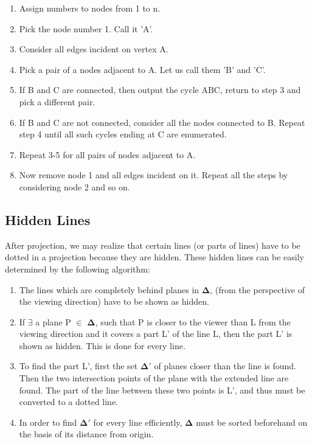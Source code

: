 \documentclass{article}
\begin{document}
\begin{enumerate}
    \item[] Assign numbers to nodes from 1 to n.
    \item Pick the node number 1. Call it 'A'.
    \item Consider all edges incident on vertex A. 
    \item Pick a pair of a nodes adjacent to A. Let us call them 'B' and 'C'.
    \item If B and C are connected, then output the cycle ABC, return to step 3 and pick a different pair.
    \item If B and C are not connected, consider all the nodes connected to B. Repeat step 4 until all such cycles ending at C are enumerated.
    \item Repeat 3-5 for all pairs of nodes adjacent to A.
    \item Now remove node 1 and all edges incident on it. Repeat all the steps by considering node 2 and so on.
\end{enumerate}

\subsection{Hidden Lines}
After projection, we may realize that certain lines (or parts of lines) have to be dotted in a projection because they are hidden. These hidden lines can be easily determined by the following algorithm:
\begin{enumerate}  
\item The lines which are completely behind planes in $\boldsymbol{\Delta}$, (from the perspective of the viewing direction) have to be shown as hidden.
\item If $\exists$ a plane P $\in$ $\boldsymbol{\Delta}$, such that P is closer to the viewer than L from the viewing direction and it covers a part L' of the line L, then the part L' is shown as hidden. This is done for every line.
\item To find the part L', first the set $\boldsymbol{\Delta'}$ of planes closer than the line is found. Then the two intersection points of the plane with the extended line are found. The part of the line between these two points is L', and thus must be converted to a dotted line.
\item In order to find $\boldsymbol{\Delta'}$ for every line efficiently, $\boldsymbol{\Delta}$ must be sorted beforehand on the basis of its distance from origin.
\end{enumerate} 
\end{document}

